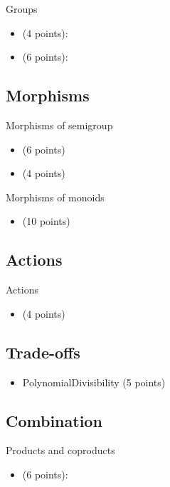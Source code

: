 Groups
\begin{itemize}
    \item {} (4 points): 
    \item {} (6 points): 
\end{itemize}

\subsection{Morphisms}
Morphisms of semigroup
\begin{itemize}
    \item {} (6 points) 
    \item {} (4 points) 
\end{itemize}

Morphisms of monoids
\begin{itemize}
    \item {} (10 points) 
\end{itemize}

\subsection{Actions}

Actions
\begin{itemize}
    \item {} (4 points) 
\end{itemize}

\subsection{Trade-offs}

\begin{itemize}
\item PolynomialDivisibility (5 points) 
\end{itemize}

\subsection{Combination}

Products and coproducts
\begin{itemize}
    \item {} (6 points): 
\end{itemize}

